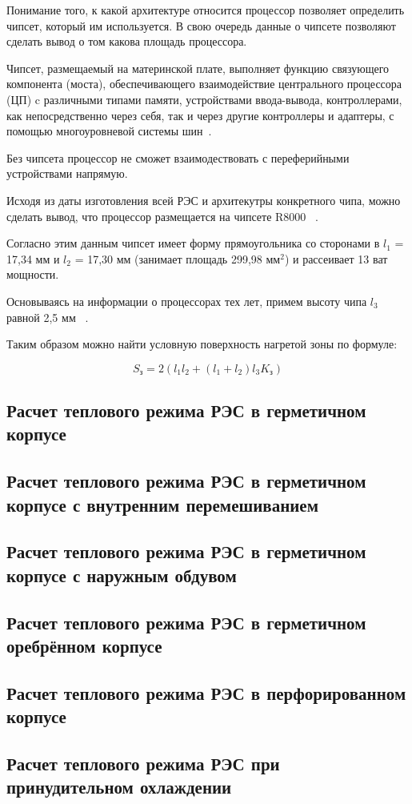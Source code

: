 Понимание того, к какой архитектуре относится процессор позволяет
определить чипсет, который им используется. В свою очередь данные о
чипсете позволяют сделать вывод о том какова площадь процессора.

Чипсет, размещаемый на материнской плате, выполняет функцию связующего
компонента (моста), обеспечивающего взаимодействие центрального
процессора (ЦП) c различными типами памяти, устройствами ввода-вывода,
контроллерами, как непосредственно через себя, так и через другие
контроллеры и адаптеры, с помощью многоуровневой системы
шин~\cite{Avdeev2019}.

Без чипсета процессор не сможет взаимодествовать с переферийными
устройствами напрямую.

Исходя из даты изготовления всей РЭС и архитекутры конкретного чипа,
можно сделать вывод, что процессор размещается на чипсете R8000
~\cite{R8000_physical_wikipedia}.

Согласно этим данным чипсет имеет форму прямоугольника со сторонами в
$l_1$ = 17,34 мм и $l_2$ = 17,30 мм (занимает площадь 299,98 мм$^2$) и
рассеивает 13 ват мощности.

Основываясь на информации о процессорах тех лет, примем высоту чипа
$l_3$ равной 2,5 мм ~\cite{MobilePentium3_wikipedia}.

Таким образом можно найти условную поверхность нагретой зоны по
формуле:

\begin{equation}
S \mathrm{_з} = 2 (l_1 l_2 + (l_1 + l_2) l_3 K \mathrm{_з} )
\end{equation}

\subsection{Расчет теплового режима РЭС в герметичном корпусе}

\subsection{Расчет теплового режима РЭС в герметичном корпусе с внутренним перемешиванием}

\subsection{Расчет теплового режима РЭС в герметичном корпусе с наружным обдувом}

\subsection{Расчет теплового режима РЭС в герметичном оребрённом корпусе}

\subsection{Расчет теплового режима РЭС в перфорированном корпусе}

\subsection{Расчет теплового режима РЭС при принудительном охлаждении}%